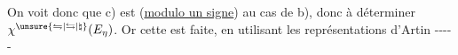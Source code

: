 On voit donc que c) est  (\uline{modulo un signe}) au cas de b), donc à déterminer $\chi^{\unsure{\leftrightharpoons|\leftrightarrows|\natural}}(E_\eta)$. Or cette  est faite, en utilisant les représentations d'Artin -{}-{}-{}-{}-
